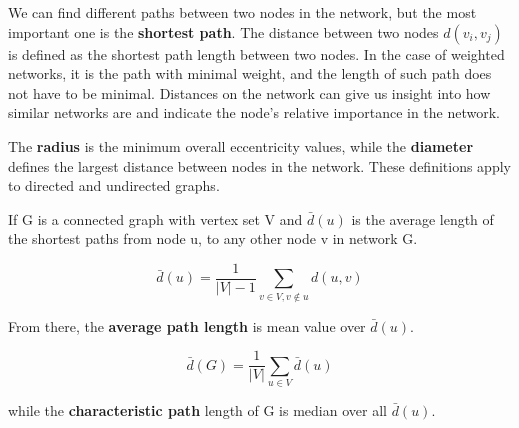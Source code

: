 We can find different paths between two nodes in the network, but the most important one is the \textbf{shortest path}. The distance between two nodes $d(v_i, v_j)$ is defined as the shortest path length between two nodes. 
In the case of weighted networks, it is the path with minimal weight, and the length of such path does not have to be minimal. Distances on the network can give us insight into how similar networks are and indicate the node's relative importance in the network. 

The \textbf{radius} is the minimum overall eccentricity values, while the \textbf{diameter} defines the largest distance between nodes in the network. These definitions apply to directed and undirected graphs. 

If G is a connected graph with vertex set V and $\bar{d}(u)$ is the average length of the shortest paths from node u, to any other node v in network G.

\begin{equation}
\bar{d}(u) = \frac{1}{|V|-1} \sum_{v\in V, v \notin u} d(u,v)  
\end{equation}

From there, the \textbf{average path length} is mean value over $\bar{d}(u)$.

\begin{equation}
\bar{d}(G) = \frac{1}{|V|}\sum_{u \in V} \bar{d}(u)
\end{equation}

while the \textbf{characteristic path} length of G is median over all $\bar{d}(u)$.





